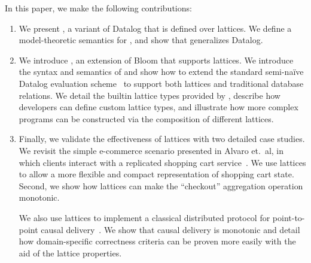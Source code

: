 In this paper, we make the following contributions:
\begin{enumerate}
\item
  We present \baselang, a variant of Datalog that is defined over lattices. We
  define a model-theoretic semantics for \baselang, and show that \baselang
  generalizes Datalog.

\item
  We introduce \lang, an extension of Bloom that supports lattices. We introduce
  the syntax and semantics of \lang and show how to extend the standard
  semi-na\"{i}ve Datalog evaluation scheme~\cite{Balbin1987} to support both
  lattices and traditional database relations. We detail the builtin lattice
  types provided by \lang, describe how developers can define custom lattice
  types, and illustrate how more complex programs can be constructed via the
  composition of different lattices.

\item
  Finally, we validate the effectiveness of lattices with two detailed case
  studies. We revisit the simple e-commerce scenario presented in Alvaro et.\
  al, in which clients interact with a replicated shopping cart
  service~\cite{Alvaro2011}. We use lattices to allow a more flexible and
  compact representation of shopping cart state. Second, we show how lattices
  can make the ``checkout'' aggregation operation monotonic.

  We also use lattices to implement a classical distributed protocol for
  point-to-point causal delivery~\cite{Schiper1989}. We show that causal
  delivery is monotonic and detail how domain-specific correctness criteria can
  be proven more easily with the aid of the lattice properties.
\end{enumerate}
